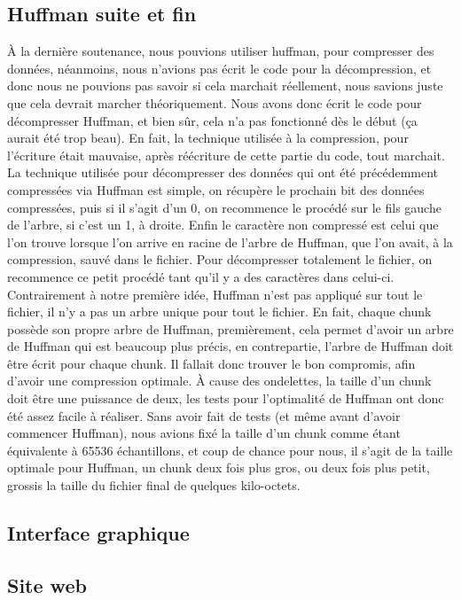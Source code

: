 \documentclass[a4paper,12pt]{article}
\begin{document}
	\subsection{Huffman suite et fin}
À la dernière soutenance, nous pouvions utiliser huffman, pour compresser des
données, néanmoins, nous n'avions pas écrit le code pour la décompression, et
donc nous ne pouvions pas savoir si cela marchait réellement, nous savions juste
que cela devrait marcher théoriquement. Nous avons donc écrit le code pour
décompresser Huffman, et bien sûr, cela n'a pas fonctionné dès le début (ça
aurait été trop beau). En fait, la technique utilisée à la compression, pour
l'écriture était mauvaise, après réécriture de cette partie du code, tout
marchait.\\
La technique utilisée pour décompresser des données qui ont été précédemment
compressées via Huffman est simple, on récupère le prochain bit des données
compressées, puis si il s'agit d'un 0, on recommence le procédé sur le fils
gauche de l'arbre, si c'est un 1, à droite. Enfin le caractère non compressé est
celui que l'on trouve lorsque l'on arrive en racine de l'arbre de Huffman, que
l'on avait, à la compression, sauvé dans le fichier. Pour décompresser
totalement le fichier, on recommence ce petit
procédé tant qu'il y a des caractères dans celui-ci.\\
Contrairement à notre première idée, Huffman n'est pas appliqué sur tout le
fichier, il n'y a pas un arbre unique pour tout le fichier. En fait, chaque
chunk possède son propre arbre de Huffman, premièrement, cela permet d'avoir un
arbre de Huffman qui est beaucoup plus précis, en contrepartie, l'arbre de
Huffman doit être écrit pour chaque chunk. Il fallait donc trouver le bon
compromis, afin d'avoir une compression optimale. À cause des ondelettes, la
taille d'un chunk doit être une puissance de deux, les tests pour l'optimalité
de Huffman ont donc été assez facile à réaliser. Sans avoir fait de tests (et
même avant d'avoir commencer Huffman), nous avions fixé la taille d'un chunk
comme étant équivalente à 65536 échantillons, et coup de chance pour nous, il
s'agit de la taille optimale pour Huffman, un chunk deux fois plus gros, ou deux
fois plus petit, grossis la taille du fichier final de quelques
kilo-octets.\\
	\subsection{Interface graphique}
	\subsection{Site web}
\end{document}
